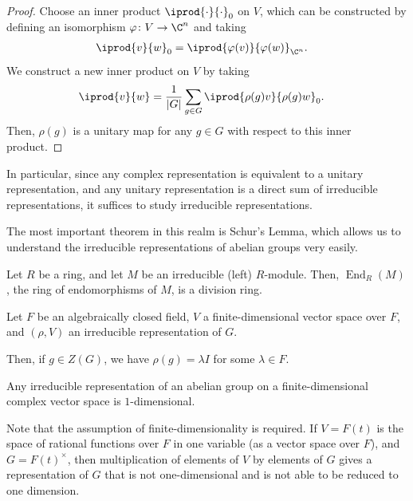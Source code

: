 \documentclass[10pt]{mypackage}
\begin{document}
\begin{proof}
  Choose an inner product $ \iprod{\cdot}{\cdot}_0 $ on $V$, which can be constructed by defining an isomorphism $\varphi\colon V\rightarrow \C^n$ and taking
  \begin{align*}
    \iprod{v}{w}_{0} &= \iprod{\varphi(v)}{\varphi(w)}_{\C^n}.
  \end{align*}
  We construct a new inner product on $V$ by taking
  \begin{align*}
    \iprod{v}{w} &= \frac{1}{\left\vert G \right\vert}\sum_{g\in G} \iprod{\rho(g)v}{\rho(g)w}_{0}.
  \end{align*}
  Then, $\rho(g)$ is a unitary map for any $g\in G$ with respect to this inner product.
\end{proof}
In particular, since any complex representation is equivalent to a unitary representation, and any unitary representation is a direct sum of irreducible representations, it suffices to study irreducible representations.

The most important theorem in this realm is Schur's Lemma, which allows us to understand the irreducible representations of abelian groups very easily.
\begin{theorem}
  Let $R$ be a ring, and let $M$ be an irreducible (left) $R$-module. Then, $\operatorname{End}_R(M)$, the ring of endomorphisms of $M$, is a division ring.
\end{theorem}
\begin{theorem}
  Let $F$ be an algebraically closed field, $V$ a finite-dimensional vector space over $F$, and $\left( \rho,V \right)$ an irreducible representation of $G$.

  Then, if $g\in Z(G)$, we have $\rho(g) = \lambda I$ for some $\lambda\in F$.
\end{theorem}
\begin{corollary}
  Any irreducible representation of an abelian group on a finite-dimensional complex vector space is $1$-dimensional.
\end{corollary}
Note that the assumption of finite-dimensionality is required. If $V = F(t)$ is the space of rational functions over $F$ in one variable (as a vector space over $F$), and $G = F(t)^{\times}$, then multiplication of elements of $V$ by elements of $G$ gives a representation of $G$ that is not one-dimensional and is not able to be reduced to one dimension.
\end{document}
